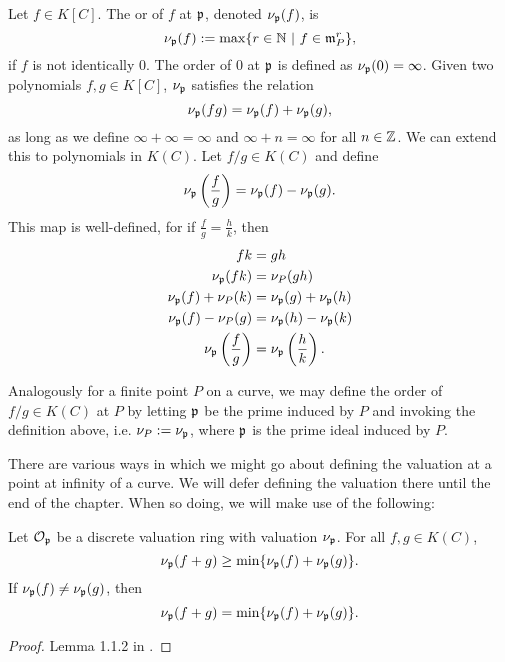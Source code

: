 Let $f \in K[C]$.
The  or  of $f$ at $\frak p$, denoted $\nu_{\frak p}(f)$, is
\[ \nu_{\frak p}(f) := \max\{ r \in \bb N ~|~ f \in \frak m_P^r \}, \]
if $f$ is not identically 0.
The order of 0 at $\frak p$ is defined as $\nu_{\frak p}(0) = \infty$.
Given two polynomials $f, g \in K[C]$, $\nu_{\frak p}$ satisfies the relation
\[ \nu_{\frak p}(fg) = \nu_{\frak p}(f) + \nu_{\frak p}(g), \]
as long as we define $\infty + \infty = \infty$ and $\infty + n = \infty$ for all $n \in \bb Z$.
We can extend this to polynomials in $K(C)$.
Let $f/g \in K(C)$ and define
\[ \nu_{\frak p}\left(\frac f g\right) = \nu_{\frak p}(f) - \nu_{\frak p}(g). \]
This map is well-defined,
for if $\frac f g = \frac h k$, then
\begin{align*}
  fk &= gh \\
  \nu_{\frak p}(fk) &= \nu_P(gh) \\
  \nu_{\frak p}(f) + \nu_P(k) &= \nu_{\frak p}(g) + \nu_{\frak p}(h) \\
  \nu_{\frak p}(f) - \nu_P(g) &= \nu_{\frak p}(h) - \nu_{\frak p}(k) \\
  \nu_{\frak p}\left(\frac f g\right) &= \nu_{\frak p}\left(\frac h k\right).
\end{align*}

Analogously for a finite point $P$ on a curve,
we may define the order of $f/g \in K(C)$ at $P$
by letting $\frak p$ be the prime induced by $P$ and invoking the definition above,
i.e. $\nu_P := \nu_{\frak p}$, where $\frak p$ is the prime ideal induced by $P$.

There are various ways in which we might go about defining the valuation at a point at infinity of a curve.
We will defer defining the valuation there until the end of the chapter.
When so doing, we will make use of the following:
\begin{proposition}
  \label{prop_valuation_min}
  Let $\cal O_{\frak p}$ be a discrete valuation ring with valuation $\nu_{\frak p}$.
  For all $f, g \in K(C)$,
  \[ \nu_{\frak p}(f + g) \geq \min\{ \nu_{\frak p}(f) + \nu_{\frak p}(g) \}. \]
  If $\nu_{\frak p}(f) \neq \nu_{\frak p}(g)$, then
  \[ \nu_{\frak p}(f + g) = \min\{ \nu_{\frak p}(f) + \nu_{\frak p}(g) \}. \]
\end{proposition}
\begin{proof}
  Lemma 1.1.2 in \cite{goldschmidt03}.
\end{proof}

